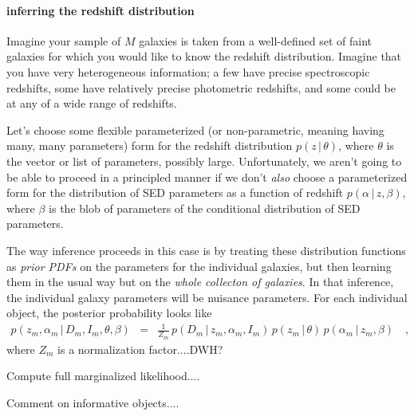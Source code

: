 \documentclass[12pt]{article}
\newcommand{\given}{\,|\,}
\begin{document}
\paragraph{inferring the redshift distribution}
Imagine your sample of $M$ galaxies is taken from a well-defined set
of faint galaxies for which you would like to know the redshift
distribution.  Imagine that you have very heterogeneous information; a
few have precise spectroscopic redshifts, some have relatively precise
photometric redshifts, and some could be at any of a wide range of
redshifts.

Let's choose some flexible parameterized (or non-parametric, meaning
having many, many parameters) form for the redshift distribution $p(z
\given \theta)$, where $\theta$ is the vector or list of parameters,
possibly large.  Unfortunately, we aren't going to be able to proceed
in a principled manner if we don't \emph{also} choose a parameterized
form for the distribution of SED parameters as a function of redshift
$p(\alpha \given z, \beta)$, where $\beta$ is the blob of parameters
of the conditional distribution of SED parameters.

The way inference proceeds in this case is by treating these
distribution functions as \emph{prior PDFs} on the parameters for the
individual galaxies, but then learning them in the usual way but on
the \emph{whole collecton of galaxies}.  In that inference, the
individual galaxy parameters will be nuisance parameters.  For each
individual object, the posterior probability looks like
\begin{eqnarray}
p(z_m, \alpha_m \given D_m, I_m, \theta, \beta) &=&
  \frac{1}{Z_m}\,p(D_m \given z_m, \alpha_m, I_m)
  \,p(z_m \given \theta)\,p(\alpha_m \given z_m, \beta)
\quad ,
\end{eqnarray}
where $Z_m$ is a normalization factor....DWH?

Compute full marginalized likelihood....

Comment on informative objects....
\end{document}
